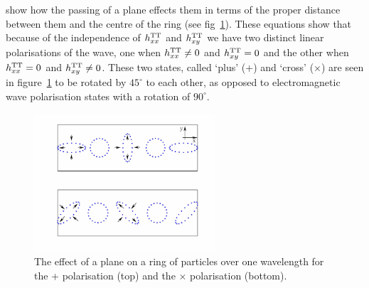 show how the passing of a plane \gw effects them in terms of the proper distance between them and
the centre of the ring (see fig~\ref{ringofparticles}). These equations show that because of the
independence of $h_{xx}^{\rm TT}$ and $h_{xy}^{\rm TT}$ we have two distinct linear polarisations of
the wave, one when $h_{xx}^{\rm TT} \ne 0$ and $h_{xy}^{\rm TT}=0$ and the other when $h_{xx}^{\rm
TT} = 0$ and $h_{xy}^{\rm TT}\ne0$. These two states, called `plus' (+) and `cross' ($\times$) are
seen in figure~\ref{ringofparticles} to be rotated by $45^{\circ}$ to each other, as opposed to
electromagnetic wave polarisation states with a rotation of $90^{\circ}$.
\begin{figure}[!htbp]
\begin{center}
\includegraphics[width=0.6\textwidth]{figs/ringofparticles}\caption[Effect of a \gw on a ring of
particles.]{The effect of a plane \gw on a ring of particles over one wavelength for the +
polarisation (top) and the $\times$ polarisation (bottom).}\label{ringofparticles}
\end{center}
\end{figure}

